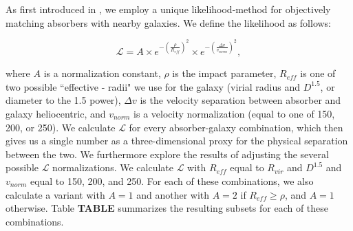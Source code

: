 \documentclass[twocolumn,tighten]{aastex62}
\begin{document}
As first introduced in \cite{french2017}, we employ a unique likelihood-method for objectively matching absorbers with nearby galaxies. We define the likelihood as follows: 

\begin{equation}
\mathcal{L} = A \times e^{-(\frac{\rho}{R_{eff}})^2} \times e^{-(\frac{\Delta v}{v_{norm}})^2},
\end{equation}

where $A$ is a normalization constant, $\rho$ is the impact parameter, $R_{eff}$ is one of two possible ``effective - radii" we use for the galaxy (virial radius and $D^{1.5}$, or diameter to the 1.5 power), $\Delta v$ is the velocity separation between absorber and galaxy heliocentric, and $v_{norm}$ is a velocity normalization (equal to one of 150, 200, or 250). We calculate $\mathcal{L}$ for every absorber-galaxy combination, which then gives us a single number as a three-dimensional proxy for the physical separation between the two. We furthermore explore the results of adjusting the several possible $\mathcal{L}$ normalizations. We calculate $\mathcal{L}$ with $R_{eff}$ equal to $R_{vir}$ and $D^{1.5}$ and $v_{norm}$ equal to 150, 200, and 250. For each of these combinations, we also calculate a variant with $A =1$ and another with $A = 2$ if $R_{eff} \ge \rho$, and $A=1$ otherwise. Table \textbf{TABLE} summarizes the resulting subsets for each of these combinations.
\end{document}
